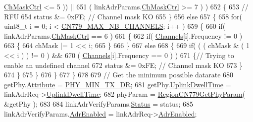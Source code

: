 \begin{DoxyCode}
      \mbox{\hyperlink{structs_region_common_link_adr_params_ac5e1891f30a172b2ce39bc3498e1843d}{ChMaskCtrl}} <= 5 )) ||
651                 ( linkAdrParams.\mbox{\hyperlink{structs_region_common_link_adr_params_ac5e1891f30a172b2ce39bc3498e1843d}{ChMaskCtrl}} >= 7 ) )
652         \{
653             \textcolor{comment}{// RFU}
654             status &= 0xFE; \textcolor{comment}{// Channel mask KO}
655         \}
656         \textcolor{keywordflow}{else}
657         \{
658             \textcolor{keywordflow}{for}( uint8\_t i = 0; i < \mbox{\hyperlink{group___r_e_g_i_o_n_c_n779_gaa23230e648a8147840e88f03f9d3b7fc}{CN779\_MAX\_NB\_CHANNELS}}; i++ )
659             \{
660                 \textcolor{keywordflow}{if}( linkAdrParams.\mbox{\hyperlink{structs_region_common_link_adr_params_ac5e1891f30a172b2ce39bc3498e1843d}{ChMaskCtrl}} == 6 )
661                 \{
662                     \textcolor{keywordflow}{if}( \mbox{\hyperlink{_region_c_n779_8c_ad43b16563c3a87159ec34d1db860a3da}{Channels}}[i].Frequency != 0 )
663                     \{
664                         chMask |= 1 << i;
665                     \}
666                 \}
667                 \textcolor{keywordflow}{else}
668                 \{
669                     \textcolor{keywordflow}{if}( ( ( chMask & ( 1 << i ) ) != 0 ) &&
670                         ( \mbox{\hyperlink{_region_c_n779_8c_ad43b16563c3a87159ec34d1db860a3da}{Channels}}[i].Frequency == 0 ) )
671                     \{\textcolor{comment}{// Trying to enable an undefined channel}
672                         status &= 0xFE; \textcolor{comment}{// Channel mask KO}
673                     \}
674                 \}
675             \}
676         \}
677     \}
678 
679     \textcolor{comment}{// Get the minimum possible datarate}
680     getPhy.\mbox{\hyperlink{structs_get_phy_params_abdcb168ffd6913b85e2f635d7a475f2d}{Attribute}} = \mbox{\hyperlink{group___r_e_g_i_o_n_gga51cbe8f5433d914fe9cf81b451de2c2daace3e56c88b40def8ed6a9106871e7de}{PHY\_MIN\_TX\_DR}};
681     getPhy.\mbox{\hyperlink{structs_get_phy_params_a0e6663762d6f9173bc8d8cb018f8f17a}{UplinkDwellTime}} = linkAdrReq->\mbox{\hyperlink{structs_link_adr_req_params_a0e6663762d6f9173bc8d8cb018f8f17a}{UplinkDwellTime}};
682     phyParam = \mbox{\hyperlink{group___r_e_g_i_o_n_c_n779_gab45c9a48b25622ab197ab8510cc7cbc0}{RegionCN779GetPhyParam}}( &getPhy );
683 
684     linkAdrVerifyParams.\mbox{\hyperlink{structs_region_common_link_adr_req_verify_params_a7ca418fa247ab5f1df4e8b5852d8b738}{Status}} = status;
685     linkAdrVerifyParams.\mbox{\hyperlink{structs_region_common_link_adr_req_verify_params_ab3e2fb44577c95786e11aacd56769703}{AdrEnabled}} = linkAdrReq->\mbox{\hyperlink{structs_link_adr_req_params_ab3e2fb44577c95786e11aacd56769703}{AdrEnabled}};

\end{DoxyCode}
